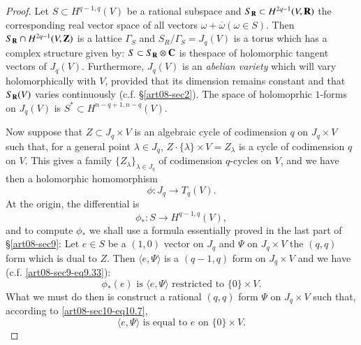 \begin{proof}
Let $S\subset H^{q-1,q}(V)$ be a rational subspace and $S_{\mathbf{R}}\subset H^{2q-1}(V,\mathbf{R})$ the corresponding real vector space of all vectors $\omega+\overline{\omega}(\omega\in S)$. Then $S_{\mathbf{R}}\cap H^{2q-1}(V,\mathbf{Z})$ is a lattice $\Gamma_{S}$ and $S_{R}/\Gamma_{S}=J_{q}(V)$ is a torus which has a complex structure given by: $S\subset S_{\mathbf{R}}\otimes \mathbf{C}$ is the\pageoriginale space of holomorphic tangent vectors of $J_{q}(V)$. Furthermore, $J_{q}(V)$ is an {\em abelian variety} which will vary holomorphically with $V$, provided that its dimension remains constant and that $S_{\mathbf{R}}(V)$ varies continuously (c.f. \S\ref{art08-sec2}). The space of holomoprhic $1$-forms on $J_{q}(V)$ is $S^{*}\subset H^{n-q+1,n-q}(V)$.

Now suppose that $Z\subset J_{q}\times V$ is an algebraic cycle of codimension $q$ on $J_{q}\times V$ such that, for a general point $\lambda\in J_{q}$, $Z\cdot \{\lambda\}\times V=Z_{\lambda}$ is a cycle of codimension $q$ on $V$. This gives a family $\{Z_{\lambda}\}_{\lambda\in J_{q}}$ of codimension $q$-cycles on $V$, and we have then a holomorphic homomorphism
\begin{equation*}
\phi : J_{q}\to T_{q}(V).\tag{10.5}\label{art08-sec10-eq10.5}
\end{equation*}
At the origin, the differential is
\begin{equation*}
\phi_{*}:S\to H^{q-1,q}(V),\tag{10.6}\label{art08-sec10-eq10.6}
\end{equation*}
and to compute $\phi_{*}$ we shall use a formula essentially proved in the last part of \S\ref{art08-sec9}: Let $e\in S$ be a $(1,0)$ vector on $J_{q}$ and $\Psi$ on $J_{q}\times V$ the $(q,q)$ form which is dual to $Z$. Then $\langle e,\Psi\rangle$ is a $(q-1,q)$ form on $J_{q}\times V$ and we have (c.f. \eqref{art08-sec9-eq9.33}):
\begin{equation*}
\phi_{*}(e)\text{ is } \langle e,\Psi\rangle \text{ restricted to } \{0\}\times V.\tag{10.7}\label{art08-sec10-eq10.7}
\end{equation*}
What we must do then is construct a rational $(q,q)$ form $\Psi$ on $J_{q}\times V$ such that, according to \eqref{art08-sec10-eq10.7},
\begin{equation*}
\langle e,\Psi\rangle \text{ is equal to $e$ on } \{0\}\times V.\tag{10.8}\label{art08-sec10-eq10.8}
\end{equation*}


\end{proof}

